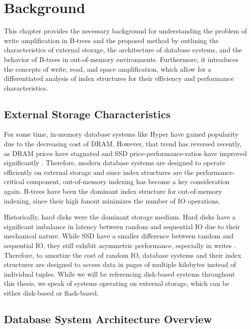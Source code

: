 \chapter{Background}
This chapter provides the necessary background for understanding the problem of write amplification in B-trees and the proposed method by outlining the characteristics of external storage, the architecture of database systems, and the behavior of B-trees in out-of-memory environments. 
Furthermore, it introduces the concepts of write, read, and space amplification, which allow for a differentiated analysis of index structures for their efficiency and performance characteristics.

\section{External Storage Characteristics}
For some time, in-memory database systems like Hyper \cite{kemper2011hyper} have gained popularity due to the decreasing cost of \ac{DRAM}.
However, that trend has reversed recently, as \ac{DRAM} prices have stagnated \cite{haas2023modern} and \ac{SSD} price-performance-ratios have improved significantly \cite{leis2024leanstore}.
Therefore, modern database systems are designed to operate efficiently on external storage and since index structures are the performance-critical component, out-of-memory indexing has become a key consideration again.
B-trees have been the dominant index structure for out-of-memory indexing, since their high fanout minimizes the number of \ac{IO} operations.

Historically, hard disks were the dominant storage medium.
Hard disks have a significant imbalance in latency between random and sequential \ac{IO} due to their mechanical nature.
While \ac{SSD} have a smaller difference between random and sequential \ac{IO}, they still exhibit asymmetric performance, especially in writes \cite{haas2023modern}.
Therefore, to amortize the cost of random \ac{IO}, database systems and their index structures are designed to access data in pages of multiple kilobytes instead of individual tuples.
While we will be referencing disk-based systems throughout this thesis, we speak of systems operating on external storage, which can be either disk-based or flash-based.


\section{Database System Architecture Overview}

